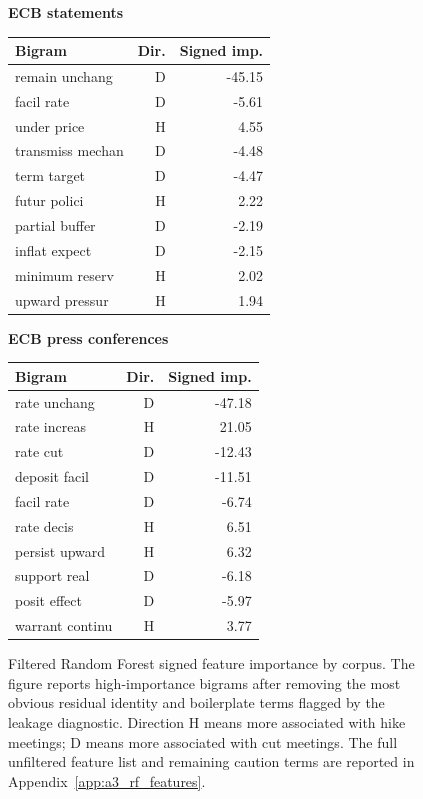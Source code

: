 \begin{figure}[H]
\vspace{0.25cm}
\begin{minipage}{0.48\textwidth}
\centering
\scriptsize
\textbf{ECB statements}\par
\vspace{0.08cm}
\begin{tabular}{lrr}
\toprule
Bigram & Dir. & Signed imp. \\
\midrule
remain unchang & D & -45.15 \\
facil rate & D & -5.61 \\
under price & H & 4.55 \\
transmiss mechan & D & -4.48 \\
term target & D & -4.47 \\
futur polici & H & 2.22 \\
partial buffer & D & -2.19 \\
inflat expect & D & -2.15 \\
minimum reserv & H & 2.02 \\
upward pressur & H & 1.94 \\
\bottomrule
\end{tabular}
\end{minipage}
\hfill
\begin{minipage}{0.48\textwidth}
\centering
\scriptsize
\textbf{ECB press conferences}\par
\vspace{0.08cm}
\begin{tabular}{lrr}
\toprule
Bigram & Dir. & Signed imp. \\
\midrule
rate unchang & D & -47.18 \\
rate increas & H & 21.05 \\
rate cut & D & -12.43 \\
deposit facil & D & -11.51 \\
facil rate & D & -6.74 \\
rate decis & H & 6.51 \\
persist upward & H & 6.32 \\
support real & D & -6.18 \\
posit effect & D & -5.97 \\
warrant continu & H & 3.77 \\
\bottomrule
\end{tabular}
\end{minipage}
  \caption[Random Forest signed feature importance]{Filtered Random Forest
    signed feature importance by corpus. The figure reports high-importance
    bigrams after removing the most obvious residual identity and boilerplate
    terms flagged by the leakage diagnostic. Direction H means more associated
    with hike meetings; D means more associated with cut meetings. The full
    unfiltered feature list and remaining caution terms are reported in
    Appendix~\ref{app:a3_rf_features}.}
  \label{fig:rf_feature_importance_v31}
\end{figure}


